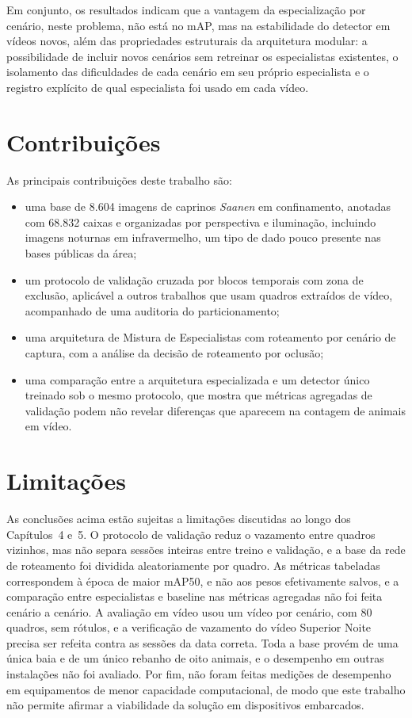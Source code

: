 Em conjunto, os resultados indicam que a vantagem da especialização por cenário, neste problema, não está no mAP, mas na estabilidade do detector em vídeos novos, além das propriedades estruturais da arquitetura modular: a possibilidade de incluir novos cenários sem retreinar os especialistas existentes, o isolamento das dificuldades de cada cenário em seu próprio especialista e o registro explícito de qual especialista foi usado em cada vídeo.

\section{Contribuições}
\label{sec:contribuicoes-finais}

As principais contribuições deste trabalho são:
\begin{itemize}
    \item uma base de 8.604 imagens de caprinos \textit{Saanen} em confinamento, anotadas com 68.832 caixas e organizadas por perspectiva e iluminação, incluindo imagens noturnas em infravermelho, um tipo de dado pouco presente nas bases públicas da área;
    \item um protocolo de validação cruzada por blocos temporais com zona de exclusão, aplicável a outros trabalhos que usam quadros extraídos de vídeo, acompanhado de uma auditoria do particionamento;
    \item uma arquitetura de Mistura de Especialistas com roteamento por cenário de captura, com a análise da decisão de roteamento por oclusão;
    \item uma comparação entre a arquitetura especializada e um detector único treinado sob o mesmo protocolo, que mostra que métricas agregadas de validação podem não revelar diferenças que aparecem na contagem de animais em vídeo.
\end{itemize}

\section{Limitações}
\label{sec:limitacoes}

As conclusões acima estão sujeitas a limitações discutidas ao longo dos Capítulos~4 e~5. O protocolo de validação reduz o vazamento entre quadros vizinhos, mas não separa sessões inteiras entre treino e validação, e a base da rede de roteamento foi dividida aleatoriamente por quadro. As métricas tabeladas correspondem à época de maior mAP50, e não aos pesos efetivamente salvos, e a comparação entre especialistas e baseline nas métricas agregadas não foi feita cenário a cenário. A avaliação em vídeo usou um vídeo por cenário, com 80 quadros, sem rótulos, e a verificação de vazamento do vídeo Superior Noite precisa ser refeita contra as sessões da data correta. Toda a base provém de uma única baia e de um único rebanho de oito animais, e o desempenho em outras instalações não foi avaliado. Por fim, não foram feitas medições de desempenho em equipamentos de menor capacidade computacional, de modo que este trabalho não permite afirmar a viabilidade da solução em dispositivos embarcados.

